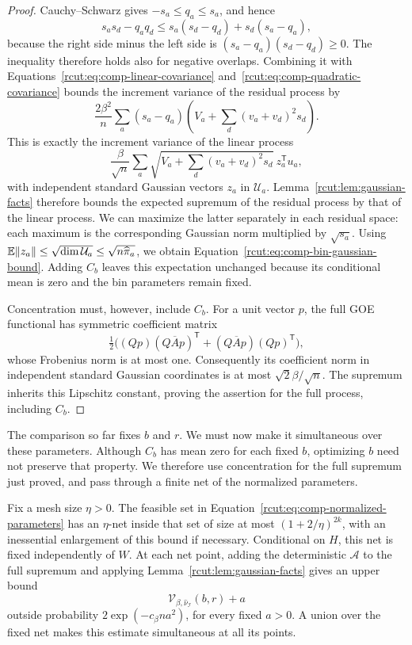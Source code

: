 \begin{proof}
 Cauchy--Schwarz gives $-s_a\le q_a\le s_a$, and hence
 \begin{equation}
  s_as_d-q_aq_d
       \le s_a(s_d-q_d)+s_d(s_a-q_a),
  \label{rcut:eq:comp-overlap-inequality}
 \end{equation}
 because the right side minus the left side is
 $(s_a-q_a)(s_d-q_d)\ge0$.  The inequality therefore holds also for
 negative overlaps.  Combining it with
 Equations~\eqref{rcut:eq:comp-linear-covariance}
 and~\eqref{rcut:eq:comp-quadratic-covariance} bounds the increment
 variance of the residual process by
 \[
  \frac{2\beta^2}{n}\sum_a(s_a-q_a)
       \left(V_a+\sum_d(v_a+v_d)^2s_d\right).
 \]
 This is exactly the increment variance of the linear process
 \[
  \frac\beta{\sqrt n}\sum_a
       \sqrt{V_a+\sum_d(v_a+v_d)^2s_d}\ z_a^{\mathsf T}u_a,
 \]
 with independent standard Gaussian vectors $z_a$ in $\mathcal U_a$.
 Lemma~\ref{rcut:lem:gaussian-facts} therefore bounds the expected
 supremum of the residual process by that of the linear process.
 We can maximize the latter separately in each residual space: each
 maximum is the corresponding Gaussian norm multiplied by
 $\sqrt{s_a}$.  Using
 $\mathbb E\|z_a\|\le\sqrt{\dim\mathcal U_a}
                     \le\sqrt{n\widehat\pi_a}$,
 we obtain Equation~\eqref{rcut:eq:comp-bin-gaussian-bound}.
 Adding $C_b$ leaves this expectation unchanged because its conditional
 mean is zero and the bin parameters remain fixed.

 Concentration must, however, include $C_b$.  For a unit vector $p$,
 the full GOE functional has symmetric coefficient matrix
 \[
  \tfrac12\bigl((Qp)(Q\overline A p)^{\mathsf T}
                +(Q\overline A p)(Qp)^{\mathsf T}\bigr),
 \]
 whose Frobenius norm is at most one.  Consequently its coefficient
 norm in independent standard Gaussian coordinates is at most
 $\sqrt2\beta/\sqrt n$.  The supremum inherits this Lipschitz
 constant, proving the assertion for the full process, including $C_b$.
\end{proof}

The comparison so far fixes $b$ and $r$.  We must now make it
simultaneous over these parameters.  Although $C_b$ has mean zero for
each fixed $b$, optimizing $b$ need not preserve that property.
We therefore use concentration for the full supremum just proved,
and pass through a finite net of the normalized parameters.

Fix a mesh size $\eta>0$.  The feasible set in
Equation~\eqref{rcut:eq:comp-normalized-parameters} has an $\eta$-net
inside that set of size at most $(1+2/\eta)^{2k}$, with an inessential
enlargement of this bound if necessary.  Conditional on $H$, this
net is fixed independently of $W$.  At each net point, adding the
deterministic $\mathcal A$ to the full supremum and applying
Lemma~\ref{rcut:lem:gaussian-facts} gives an upper bound
\begin{equation}
 \mathcal V_{\beta,\widehat\nu_{\mathcal I}}(b,r)+a
 \label{rcut:eq:comp-net-bound}
\end{equation}
outside probability $2\exp(-c_\beta n a^2)$, for every fixed $a>0$.
A union over the fixed net makes this estimate simultaneous at all
its points.

